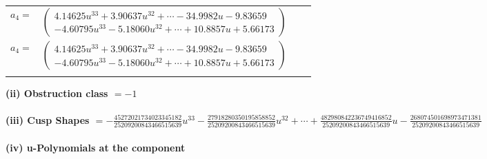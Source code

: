 \documentclass[1p]{elsarticle_modified}
\theoremstyle{definition}
\begin{document}
\begin{tabular}{m{7pt} m{180pt} m{7pt} m{180pt} }
\flushright $a_{4}=$&$\begin{pmatrix}4.14625 u^{33}+3.90637 u^{32}+\cdots-34.9982 u-9.83659\\-4.60795 u^{33}-5.18060 u^{32}+\cdots+10.8857 u+5.66173\end{pmatrix}$\\ \flushright $a_{4}=$&$\begin{pmatrix}4.14625 u^{33}+3.90637 u^{32}+\cdots-34.9982 u-9.83659\\-4.60795 u^{33}-5.18060 u^{32}+\cdots+10.8857 u+5.66173\end{pmatrix}$\\&\end{tabular}
\flushleft \textbf{(ii) Obstruction class $= -1$}\\~\\
\flushleft \textbf{(iii) Cusp Shapes $= -\frac{45272021734023345182}{25209200843466515639} u^{33}-\frac{27918280350195858852}{25209200843466515639} u^{32}+\cdots+\frac{482980842236749416852}{25209200843466515639} u-\frac{268074501698973471381}{25209200843466515639}$}\\~\\
\newpage\renewcommand{\arraystretch}{1}
\flushleft \textbf{(iv) u-Polynomials at the component}\newline \\
\end{document}
